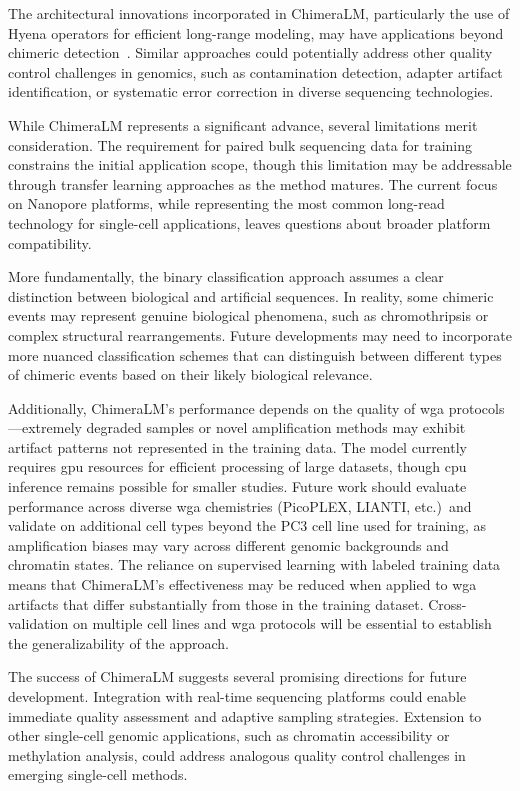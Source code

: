 \documentclass[pdflatex,sn-nature]{sn-jnl}%
\theoremstyle{thmstyleone}%
\theoremstyle{thmstyletwo}%
\theoremstyle{thmstylethree}%
\begin{document}
The architectural innovations incorporated in ChimeraLM, particularly the use of Hyena operators for efficient long-range modeling, may have applications beyond chimeric detection~\cite{Poli2023HyenaHT, nguyen2023hyenadna}.
Similar approaches could potentially address other quality control challenges in genomics, such as contamination detection, adapter artifact identification, or systematic error correction in diverse sequencing technologies.

While ChimeraLM represents a significant advance, several limitations merit consideration.
The requirement for paired bulk sequencing data for training constrains the initial application scope, though this limitation may be addressable through transfer learning approaches as the method matures.
The current focus on Nanopore platforms, while representing the most common long-read technology for single-cell applications, leaves questions about broader platform compatibility.

More fundamentally, the binary classification approach assumes a clear distinction between biological and artificial sequences.
In reality, some chimeric events may represent genuine biological phenomena, such as chromothripsis or complex structural rearrangements.
Future developments may need to incorporate more nuanced classification schemes that can distinguish between different types of chimeric events based on their likely biological relevance.

Additionally, ChimeraLM's performance depends on the quality of \gls{wga} protocols---extremely degraded samples or novel amplification methods may exhibit artifact patterns not represented in the training data.
The model currently requires \gls{gpu} resources for efficient processing of large datasets, though \gls{cpu} inference remains possible for smaller studies.
Future work should evaluate performance across diverse \gls{wga} chemistries (PicoPLEX, LIANTI, etc.)\ and validate on additional cell types beyond the PC3 cell line used for training, as amplification biases may vary across different genomic backgrounds and chromatin states.
The reliance on supervised learning with labeled training data means that ChimeraLM's effectiveness may be reduced when applied to \gls{wga} artifacts that differ substantially from those in the training dataset.
Cross-validation on multiple cell lines and \gls{wga} protocols will be essential to establish the generalizability of the approach.

The success of ChimeraLM suggests several promising directions for future development.
Integration with real-time sequencing platforms could enable immediate quality assessment and adaptive sampling strategies.
Extension to other single-cell genomic applications, such as chromatin accessibility or methylation analysis, could address analogous quality control challenges in emerging single-cell methods.
\end{document}
